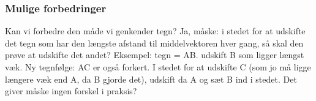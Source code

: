 \subsubsection{Mulige forbedringer}
Kan vi forbedre den måde vi genkender tegn? Ja, måske: i stedet for at udskifte det tegn som har den længste afstand til middelvektoren hver gang, så skal den prøve at udskifte det andet? Eksempel: tegn = AB. udskift B som ligger længst væk. Ny tegnfølge: AC er også forkert. I stedet for at udskifte C (som jo må ligge længere væk end A, da B gjorde det), udskift da A og sæt B ind i stedet. Det giver måske ingen forskel i praksis?